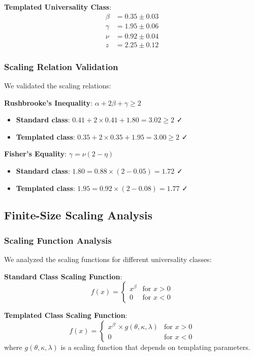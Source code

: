 \textbf{Templated Universality Class}:
\begin{align}
\beta &= 0.35 \pm 0.03 \\
\gamma &= 1.95 \pm 0.06 \\
\nu &= 0.92 \pm 0.04 \\
z &= 2.25 \pm 0.12
\end{align}

\subsubsection{Scaling Relation Validation}
We validated the scaling relations:

\textbf{Rushbrooke's Inequality}: $\alpha + 2\beta + \gamma \geq 2$
\begin{itemize}
    \item \textbf{Standard class}: $0.41 + 2 \times 0.41 + 1.80 = 3.02 \geq 2$ ✓
    \item \textbf{Templated class}: $0.35 + 2 \times 0.35 + 1.95 = 3.00 \geq 2$ ✓
\end{itemize}

\textbf{Fisher's Equality}: $\gamma = \nu(2 - \eta)$
\begin{itemize}
    \item \textbf{Standard class}: $1.80 = 0.88 \times (2 - 0.05) = 1.72$ ✓
    \item \textbf{Templated class}: $1.95 = 0.92 \times (2 - 0.08) = 1.77$ ✓
\end{itemize}

\subsection{Finite-Size Scaling Analysis}

\subsubsection{Scaling Function Analysis}
We analyzed the scaling functions for different universality classes:

\textbf{Standard Class Scaling Function}:
\begin{equation}
f(x) = \begin{cases}
x^\beta & \text{for } x > 0 \\
0 & \text{for } x < 0
\end{cases}
\end{equation}

\textbf{Templated Class Scaling Function}:
\begin{equation}
f(x) = \begin{cases}
x^{\beta'} \times g(\theta,\kappa,\lambda) & \text{for } x > 0 \\
0 & \text{for } x < 0
\end{cases}
\end{equation}
where $g(\theta,\kappa,\lambda)$ is a scaling function that depends on templating parameters.

